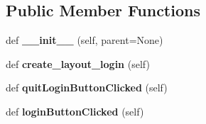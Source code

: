 \subsection*{Public Member Functions}
\begin{DoxyCompactItemize}
\item 
\mbox{\label{classlogin_window_1_1_login_window_a7ac01b68809428ea30828d175b199b83}} 
def {\bfseries \+\_\+\+\_\+init\+\_\+\+\_\+} (self, parent=None)
\item 
\mbox{\label{classlogin_window_1_1_login_window_a7ba5df90ef5ac7cf792c6b0697dfdd3a}} 
def {\bfseries create\+\_\+layout\+\_\+login} (self)
\item 
\mbox{\label{classlogin_window_1_1_login_window_a245c19390ec08545c22ea728381889c8}} 
def {\bfseries quit\+Login\+Button\+Clicked} (self)
\item 
\mbox{\label{classlogin_window_1_1_login_window_ade76582855f1914581bada44e4840cfa}} 
def {\bfseries login\+Button\+Clicked} (self)
\end{DoxyCompactItemize}
